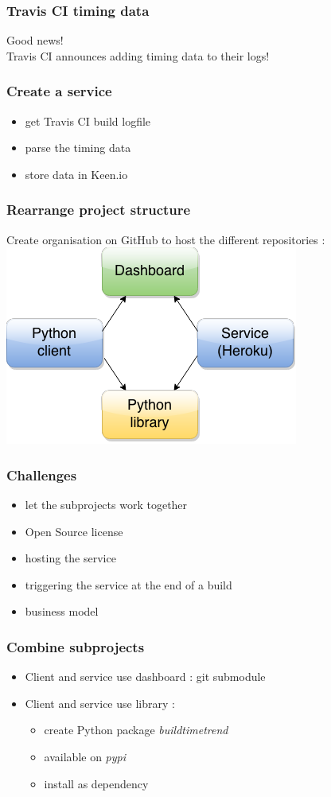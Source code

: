 \documentclass[14pt]{beamer}
\begin{document}
  \begin{frame}
    \frametitle{Travis CI timing data}
    Good news!\\
    Travis CI announces adding timing data to their logs!\\
  \end{frame}
  \begin{frame}
    \frametitle{Create a service}
    \begin{itemize}
      \item get Travis CI build logfile
      \item parse the timing data
      \item store data in Keen.io
    \end{itemize}
  \end{frame}
  \begin{frame}
    \frametitle{Rearrange project structure}
    Create organisation on GitHub to host the different repositories :\\
    \includegraphics[scale=.5]{buildtimetrend_diagram.png}
  \end{frame}
  \begin{frame}
    \frametitle{Challenges}
    \begin{itemize}
      \item let the subprojects work together
      \item Open Source license
      \item hosting the service
      \item triggering the service at the end of a build
      \item business model
    \end{itemize}
  \end{frame}
  \begin{frame}
    \frametitle{Combine subprojects}
    \begin{itemize}
    \item Client and service use dashboard : git submodule
    \item Client and service use library :
      \begin{itemize}
        \item create Python package \textit{buildtimetrend}
        \item available on \textit{pypi}
        \item install as dependency
      \end{itemize}
    \end{itemize}
  \end{frame}
\end{document}
